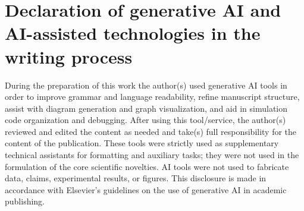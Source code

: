 \documentclass[preprint,review,12pt]{elsarticle}
\begin{document}
\section*{Declaration of generative AI and AI-assisted technologies in the writing process}
During the preparation of this work the author(s) used generative AI tools in order to improve grammar and language readability, refine manuscript structure, assist with diagram generation and graph visualization, and aid in simulation code organization and debugging. After using this tool/service, the author(s) reviewed and edited the content as needed and take(s) full responsibility for the content of the publication. These tools were strictly used as supplementary technical assistants for formatting and auxiliary tasks; they were not used in the formulation of the core scientific novelties. AI tools were not used to fabricate data, claims, experimental results, or figures. This disclosure is made in accordance with Elsevier's guidelines on the use of generative AI in academic publishing.


\balance

\end{document}
